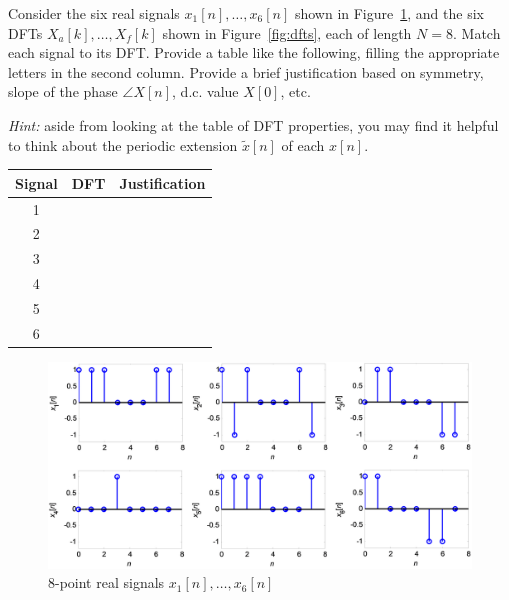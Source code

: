 \documentclass[12pt]{report}
\begin{document}
\newpage
{} 

Consider the six real signals $x_1[n], \ldots, x_6[n]$ shown in Figure~\ref{fig:sequences}, and the six DFTs $X_a[k], \ldots, X_f[k]$ shown in Figure~\ref{fig:dfts}, each of length $N = 8$. Match each signal to its DFT. Provide a table like the following, filling the appropriate letters in the second column. Provide a brief justification based on symmetry, slope of the phase  $\angle X[n]$, d.c. value $X[0]$, etc. 

\noindent\textit{Hint:} aside from looking at the table of DFT properties, you may find it helpful to think about the periodic extension $\tilde{x}[n]$ of each $x[n]$.


\begin{center}
	\begin{tabular}{c|c|p{10cm}}
	Signal & DFT & Justification \\
	\hline
	1 & & \\
	2 & & \\
	3 & & \\
	4 & & \\
	5 & & \\
	6 & & \\
	\hline
\end{tabular}
\end{center}

\FloatBarrier
\begin{figure}[h!]
	\centering
	\includegraphics[width=\textwidth]{figs/signals_match_dft.png}
	\caption{8-point real signals $x_1[n], \ldots, x_6[n]$}
	\label{fig:sequences}
\end{figure}
\FloatBarrier
\end{document}
